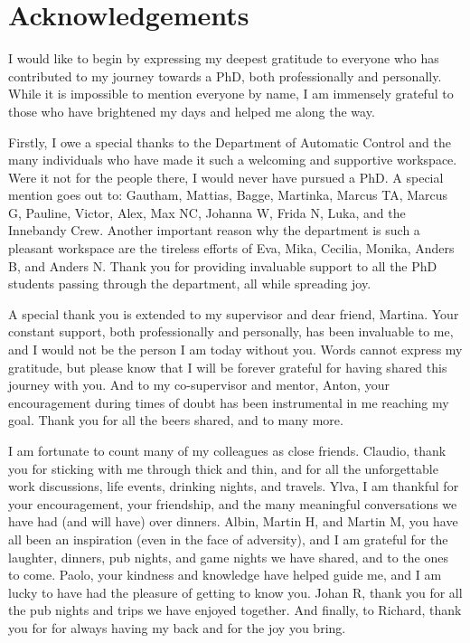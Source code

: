 \chapter*{Acknowledgements}
I would like to begin by expressing my deepest gratitude to everyone who has contributed to my journey towards a PhD, both professionally and personally.
While it is impossible to mention everyone by name, I am immensely grateful to those who have brightened my days and helped me along the way.

Firstly, I owe a special thanks to the Department of Automatic Control and the many individuals who have made it such a welcoming and supportive workspace.
Were it not for the people there, I would never have pursued a PhD.
A special mention goes out to: Gautham, Mattias, Bagge, Martinka, Marcus TA, Marcus G, Pauline, Victor, Alex, Max NC, Johanna W, Frida N, Luka, and the Innebandy Crew.
Another important reason why the department is such a pleasant workspace are the tireless efforts of Eva, Mika, Cecilia, Monika, Anders B, and Anders N.
Thank you for providing invaluable support to all the PhD students passing through the department, all while spreading joy.

A special thank you is extended to my supervisor and dear friend, Martina.
Your constant support, both professionally and personally, has been invaluable to me, and I would not be the person I am today without you.
Words cannot express my gratitude, but please know that I will be forever grateful for having shared this journey with you.
And to my co-supervisor and mentor, Anton, your encouragement during times of doubt has been instrumental in me reaching my goal.
Thank you for all the beers shared, and to many more.

I am fortunate to count many of my colleagues as close friends.
Claudio, thank you for sticking with me through thick and thin, and for all the unforgettable work discussions, life events, drinking nights, and travels.
Ylva, I am thankful for your encouragement, your friendship, and the many meaningful conversations we have had (and will have) over dinners.
Albin, Martin H, and Martin M, you have all been an inspiration (even in the face of adversity), and I am grateful for the laughter, dinners, pub nights, and game nights we have shared, and to the ones to come.
Paolo, your kindness and knowledge have helped guide me, and I am lucky to have had the pleasure of getting to know you.
Johan R, thank you for all the pub nights and trips we have enjoyed together.
And finally, to Richard, thank you for for always having my back and for the joy you bring.

